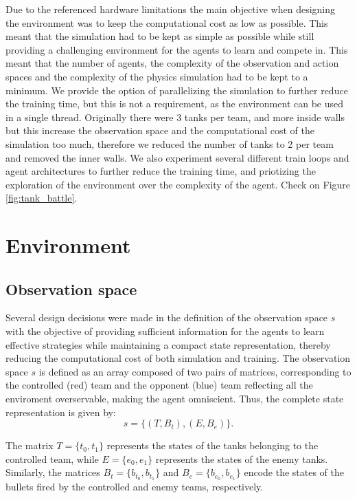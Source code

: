 \documentclass[conf]{new-aiaa}
\begin{document}
Due to the referenced hardware limitations the main objective when designing the environment was to keep the computational cost as low as possible. This meant that the simulation had to be kept as simple as possible while still providing a challenging environment for the agents to learn and compete in. This meant that the number of agents, the complexity of the observation and action spaces and the complexity of the physics simulation had to be kept to a minimum. We provide the option of parallelizing the simulation to further reduce the training time, but this is not a requirement, as the environment can be used in a single thread. Originally there were 3 tanks per team, and more inside walls but this increase the observation space and the computational cost of the simulation too much, therefore we reduced the number of tanks to 2 per team and removed the inner walls. We also experiment several different train loops and agent architectures to further reduce the training time, and priotizing the exploration of the environment over the complexity of the agent. Check on Figure \ref{fig:tank_battle}.

\section{Environment}

\subsection{Observation space}

Several design decisions were made in the definition of the observation space $s$ with the objective of providing sufficient information for the agents to learn effective strategies while maintaining a compact state representation, thereby reducing the computational cost of both simulation and training. The observation space $s$ is defined as an array composed of two pairs of matrices, corresponding to the controlled (red) team and the opponent (blue) team reflecting all the enviroment overservable, making the agent omniscient. Thus, the complete state representation is given by:
\[
s = \{(T, B_t), (E, B_e)\}.
\]

The matrix $T = \{t_0, t_1\}$ represents the states of the tanks belonging to the controlled team, while $E = \{e_0, e_1\}$ represents the states of the enemy tanks. Similarly, the matrices $B_t = \{b_{t_0}, b_{t_1}\}$ and $B_e = \{b_{e_0}, b_{e_1}\}$ encode the states of the bullets fired by the controlled and enemy teams, respectively.
\end{document}
